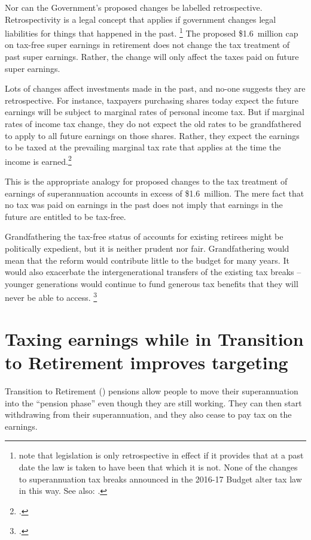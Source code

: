 \documentclass[continuous]{grattan}\usepackage[]{graphicx}\usepackage[]{color}
\begin{document}
\label{para:discussion-retrospectivity}
Nor can the Government's proposed changes be labelled retrospective. 
Retrospectivity is a legal concept that applies if government changes legal liabilities for things that happened in the past.%
\footnote{%
  \textcite[][399]{Pearce-Geddes-Statutory-interpretation-2014} note that legislation is only retrospective in effect if it provides that at a past date the law is taken to have been that which it is not. None of the changes to superannuation tax breaks announced in the 2016-17 Budget alter tax law in this way.  
  See also: \textcites{ABC-Fact-check-super-changes-retrospective}{Stewart-Ingles-2016-debate-are-super-changes-retrospective}{theOz-Creighton-2016-Super-changes-reasonable-not-retrospective}{Hutchens-2016-super-changes-seriously-good}.}
The proposed \$1.6~million cap on tax-free super earnings in retirement does not change the tax treatment of past super earnings. 
Rather, the change will only affect the taxes paid on future super earnings.

Lots of changes affect investments made in the past, and no-one suggests they are retrospective. 
For instance, taxpayers purchasing shares today expect the future earnings will be subject to marginal rates of personal income tax. But if marginal rates of income tax change, they do not expect the old rates to be grandfathered to apply to all future earnings on those shares. %
Rather, they expect the earnings to be taxed at the prevailing marginal tax rate that applies at the time the income is earned.\footcite{Daley-theConvo-Retrospective-super-claim-furphy}  

This is the appropriate analogy for proposed changes to the tax treatment of earnings of superannuation accounts in excess of \$1.6~million. 
The mere fact that no tax was paid on earnings in the past does not imply that earnings in the future are entitled to be tax-free. 


Grandfathering the tax-free status of accounts for existing retirees might be politically expedient, but it is neither prudent nor fair.
Grandfathering would mean that the reform would contribute little to the budget for many years.
It would also exacerbate the intergenerational transfers of the existing tax breaks -- younger generations would continue to fund generous tax benefits that they will never be able to access.%
\footcite[][47]{DaleyWoodWeidmannEtAl2014}

\section{Taxing earnings while in Transition to Retirement improves targeting}\label{sec:taxing-earnings-while-in-TTR}
Transition to Retirement (\TTR{}) pensions allow people to move their superannuation into the “pension phase” even though they are still working. 
They can then start withdrawing from their superannuation, and they also cease to pay tax on the earnings. 
\end{document}
